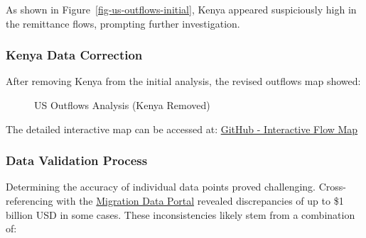 \documentclass[
  11pt,
]{article}
\begin{document}
As shown in Figure~\ref{fig-us-outflows-initial}, Kenya appeared
suspiciously high in the remittance flows, prompting further
investigation.

\subsubsection{Kenya Data Correction}\label{kenya-data-correction}

After removing Kenya from the initial analysis, the revised outflows map
showed:

\begin{figure}[H]


\caption{\label{fig-us-outflows-no-kenya}US Outflows Analysis (Kenya
Removed)}

\end{figure}%

The detailed interactive map can be accessed at:
\href{https://github.com/WilliamClintC/RER/blob/main/Code/22_flow_map_no_kenya.html}{GitHub
- Interactive Flow Map}

\subsubsection{Data Validation Process}\label{data-validation-process}

Determining the accuracy of individual data points proved challenging.
Cross-referencing with the
\href{https://www.migrationdataportal.org/themes/remittances-overview}{Migration
Data Portal} revealed discrepancies of up to \$1 billion USD in some
cases. These inconsistencies likely stem from a combination of:
\end{document}
